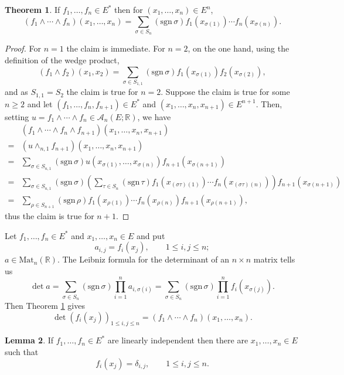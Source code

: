 \documentclass{article}
\newcommand{\sgn}{\mathrm{sgn}\,}
\newcommand{\Mat}{\mathrm{Mat}}
\theoremstyle{definition}
\newtheorem{theorem}{Theorem}
\newtheorem{lemma}[theorem]{Lemma}
\theoremstyle{definition}
\begin{document}
\begin{theorem}
If $f_1,\ldots,f_n \in E^*$ then for $(x_1,\ldots,x_n) \in E^n$,
\[
(f_1 \wedge \cdots \wedge f_n)(x_1,\ldots,x_n) = \sum_{\sigma \in S_n} (\sgn \sigma) f_1(x_{\sigma(1)}) \cdots f_n(x_{\sigma(n)}).
\]
\label{nwedge}
\end{theorem}
\begin{proof}
For $n=1$ the claim is immediate. For $n=2$,
on the one hand, using the definition of the wedge product,
\[
(f_1 \wedge f_2)(x_1,x_2) =
\sum_{\sigma \in S_{1,1}} (\sgn \sigma) f_1(x_{\sigma(1)}) f_2(x_{\sigma(2)}),
\]
and as $S_{1,1}=S_2$ the claim is true for $n=2$. 
Suppose the claim is true for some $n \geq 2$ 
and let $(f_1,\ldots,f_n,f_{n+1}) \in E^*$ and $(x_1,\ldots,x_n,x_{n+1}) \in E^{n+1}$. Then, setting
$u=f_1 \wedge \cdots \wedge f_n \in \mathscr{A}_n(E;\mathbb{R})$, we have
\[
\begin{split}
&(f_1 \wedge \cdots \wedge f_n \wedge f_{n+1})(x_1,\ldots,x_n,x_{n+1})\\
=&(u \wedge_{n,1} f_{n+1})(x_1,\ldots,x_n,x_{n+1})\\
=&\sum_{\sigma \in S_{n,1}} (\sgn \sigma) u(x_{\sigma(1)},\ldots,x_{\sigma(n)}) f_{n+1}(x_{\sigma(n+1)})\\
=&\sum_{\sigma \in S_{n,1}} (\sgn \sigma) \left( \sum_{\tau \in S_n} (\sgn \tau) f_1(x_{(\sigma \tau)(1)}) \cdots f_n(x_{(\sigma \tau)(n)}) \right) f_{n+1}(x_{\sigma(n+1)})\\
=&\sum_{\rho \in S_{n+1}} (\sgn \rho) f_1(x_{\rho(1)}) \cdots
f_n(x_{\rho(n)}) f_{n+1}(x_{\rho(n+1)}),
\end{split}
\]
thus the claim is true for $n+1$. 
\end{proof}




Let $f_1,\ldots,f_n \in E^*$ and $x_1,\ldots,x_n \in E$ and put
\[
a_{i,j}=f_i(x_j), \qquad 1 \leq i,j \leq n;
\]
$a \in \Mat_n(\mathbb{R})$.
The Leibniz formula for the determinant of an $n \times n$ matrix tells us
\[
\det a=\sum_{\sigma \in S_n} (\sgn \sigma) \prod_{i=1}^n a_{i,\sigma(i)}
=\sum_{\sigma \in S_n} (\sgn \sigma) \prod_{i=1}^n f_i(x_{\sigma(j)}).
\]
Then Theorem \ref{nwedge} gives
\[
\det (f_i(x_j))_{1 \leq i,j \leq n} = (f_1 \wedge \cdots \wedge f_n)(x_1,\ldots,x_n).
\]



\begin{lemma}
If $f_1,\ldots,f_n \in E^*$ are linearly independent then there are
$x_1,\ldots,x_n \in E$ such that
\[
f_i(x_j) = \delta_{i,j},\qquad 1 \leq i,j \leq n.
\]
\label{dualset}
\end{lemma}
\end{document}
